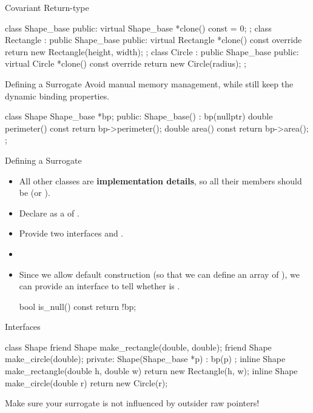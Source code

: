 \documentclass{beamer}
\begin{document}
\begin{frame}[fragile]{Covariant Return-type}
    \begin{cpp}
class Shape_base {
 public:
  virtual Shape_base *clone() const = 0;
};
class Rectangle : public Shape_base {
 public:
  virtual Rectangle *clone() const override
    { return new Rectangle(height, width); }
};
class Circle : public Shape_base {
 public:
  virtual Circle *clone() const override
    { return new Circle(radius); }
};
    \end{cpp}
\end{frame}

\begin{frame}[fragile]{Defining a Surrogate}
    Avoid manual memory management, while still keep the dynamic binding properties.
    \begin{cpp}
class Shape {
  Shape_base *bp;
 public:
  Shape_base() : bp(nullptr) {}
  double perimeter() const {
    return bp->perimeter();
  }
  double area() const {
      return bp->area();
  }
};
    \end{cpp}
\end{frame}

\begin{frame}[fragile]{Defining a Surrogate}
    \begin{itemize}
        \item All other classes are \textbf{implementation details}, so all their members should be \private (or ).
        \item Declare  as a  of .
        \item Provide two interfaces  and .
        \item {}
        \pause
        \item Since we allow default construction (so that we can define an array of ), we can provide an interface to tell whether  is .
        \begin{cpp}
bool is_null() const { return !bp; }
        \end{cpp}
    \end{itemize}
\end{frame}

\begin{frame}[fragile]{Interfaces}
    \begin{cpp}
class Shape {
  friend Shape make_rectangle(double, double);
  friend Shape make_circle(double);
 private:
  Shape(Shape_base *p) : bp(p) {}
};
inline Shape make_rectangle(double h, double w)
  { return new Rectangle(h, w); }
inline Shape make_circle(double r)
  { return new Circle(r); }
    \end{cpp}
    Make sure your surrogate is not influenced by outsider raw pointers!
\end{frame}
\end{document}
